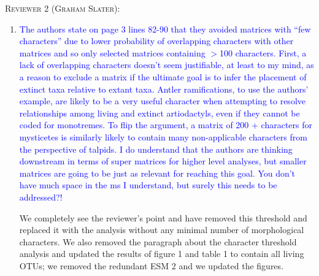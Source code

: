 \documentclass[12pt,letterpaper]{article}
\renewcommand{\section}[1]{%
\bigskip
\begin{center}
\begin{Large}
\normalfont\scshape #1
\medskip
\end{Large}
\end{center}}
\begin{document}
\section{Reviewer 2 (Graham Slater):}
\begin{enumerate}
\item{\textcolor{blue}{The authors state on page 3 lines 82-90 that they avoided matrices with ``few characters'' due to lower probability of overlapping characters with other matrices and so only selected matrices containing $>$100 characters. First, a lack of overlapping characters doesn’t seem justifiable, at least to my mind, as a reason to exclude a matrix if the ultimate goal is to infer the placement of extinct taxa relative to extant taxa. Antler ramifications, to use the authors' example, are likely to be a very useful character when attempting to resolve relationships among living and extinct artiodactyls, even if they cannot be coded for monotremes. To flip the argument, a matrix of 200 + characters for mysticetes is similarly likely to contain many non-applicable characters from the perspective of talpids. I do understand that the authors are thinking downstream in terms of super matrices for higher level analyses, but smaller matrices are going to be just as relevant for reaching this goal. You don't have much space in the ms I understand, but surely this needs to be addressed?!}}

We completely see the reviewer's point and have removed this threshold and replaced it with the analysis without any minimal number of morphological characters.
We also removed the paragraph about the character threshold analysis and updated the results of figure 1 and table 1 to contain all living OTUs; we removed the redundant ESM 2 and we updated the figures. 


\end{enumerate}
\end{document}
